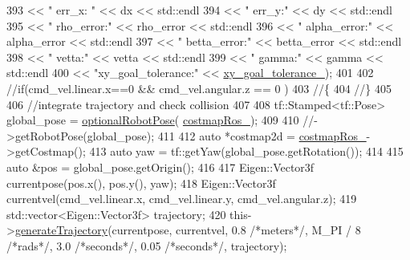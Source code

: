 \begin{DoxyCode}
{393                                               << \textcolor{stringliteral}{" err\_x: "} << dx << std::endl
394                                               << \textcolor{stringliteral}{" err\_y:"} << dy << std::endl
395                                               << \textcolor{stringliteral}{" rho\_error:"} << rho\_error << std::endl
396                                               << \textcolor{stringliteral}{" alpha\_error:"} << alpha\_error << std::endl
397                                               << \textcolor{stringliteral}{" betta\_error:"} << betta\_error << std::endl
398                                               << \textcolor{stringliteral}{" vetta:"} << vetta << std::endl
399                                               << \textcolor{stringliteral}{" gamma:"} << gamma << std::endl
400                                               << \textcolor{stringliteral}{"xy\_goal\_tolerance:"} << 
      \hyperlink{classcl__move__base__z_1_1forward__local__planner_1_1ForwardLocalPlanner_acd2ed91ee166f03faeeb9d6a4b91084b}{xy\_goal\_tolerance\_});
401 
402     \textcolor{comment}{//if(cmd\_vel.linear.x==0 && cmd\_vel.angular.z == 0 )}
403     \textcolor{comment}{//\{}
404     \textcolor{comment}{//\}}
405 
406     \textcolor{comment}{//integrate trajectory and check collision}
407 
408     tf::Stamped<tf::Pose> global\_pose = \hyperlink{namespacecl__move__base__z_1_1forward__local__planner_a4c20f9fe0ca67779c53e90182baf4997}{optionalRobotPose}(
      \hyperlink{classcl__move__base__z_1_1forward__local__planner_1_1ForwardLocalPlanner_a37791fea67ce92c6e38e3727311e533b}{costmapRos\_});
409     
410     \textcolor{comment}{//->getRobotPose(global\_pose);}
411 
412     \textcolor{keyword}{auto} *costmap2d = \hyperlink{classcl__move__base__z_1_1forward__local__planner_1_1ForwardLocalPlanner_a37791fea67ce92c6e38e3727311e533b}{costmapRos\_}->getCostmap();
413     \textcolor{keyword}{auto} yaw = tf::getYaw(global\_pose.getRotation());
414 
415     \textcolor{keyword}{auto} &pos = global\_pose.getOrigin();
416 
417     Eigen::Vector3f currentpose(pos.x(), pos.y(), yaw);
418     Eigen::Vector3f currentvel(cmd\_vel.linear.x, cmd\_vel.linear.y, cmd\_vel.angular.z);
419     std::vector<Eigen::Vector3f> trajectory;
420     this->\hyperlink{classcl__move__base__z_1_1forward__local__planner_1_1ForwardLocalPlanner_a3e852f81ccae82c56d7f25e56def899c}{generateTrajectory}(currentpose, currentvel, 0.8 \textcolor{comment}{/*meters*/}, M\_PI / 8 \textcolor{comment}{/*rads*/}, 
      3.0 \textcolor{comment}{/*seconds*/}, 0.05 \textcolor{comment}{/*seconds*/}, trajectory);
}
\end{DoxyCode}
